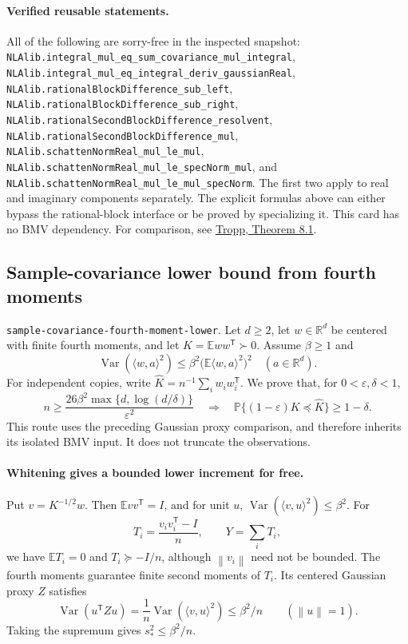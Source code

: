 \documentclass[11pt,a4paper]{article}
\newcommand{\R}{\mathbb R}
\newcommand{\norm}[1]{\left\lVert#1\right\rVert}
\DeclareRobustCommand{\code}[1]{{\footnotesize\urlstyle{tt}\nolinkurl{#1}}}
\begin{document}
\paragraph{Verified reusable statements.}
All of the following are sorry-free in the inspected snapshot:
\code{NLAlib.integral_mul_eq_sum_covariance_mul_integral},
\code{NLAlib.integral_mul_eq_integral_deriv_gaussianReal},
\code{NLAlib.rationalBlockDifference_sub_left},
\code{NLAlib.rationalBlockDifference_sub_right},
\code{NLAlib.rationalSecondBlockDifference_resolvent},
\code{NLAlib.rationalSecondBlockDifference_mul},
\code{NLAlib.schattenNormReal_mul_le_mul},
\code{NLAlib.schattenNormReal_mul_le_specNorm_mul}, and
\code{NLAlib.schattenNormReal_mul_le_mul_specNorm}.
The first two apply to real and imaginary components separately.  The
explicit formulas above can either bypass the rational-block interface
or be proved by specializing it.  This card has no BMV dependency.
For comparison, see
\href{https://arxiv.org/html/2603.05803v2#S8}{Tropp, Theorem 8.1}.

\subsection{Sample-covariance lower bound from fourth moments}
\label{route:sample-covariance-fourth-moment-lower}
\code{sample-covariance-fourth-moment-lower}.
Let $d\ge2$, let $w\in\R^d$ be centered with finite fourth moments,
and let $K=\mathbb Eww^{\mathsf T}\succ0$.  Assume $\beta\ge1$ and
\[
 \operatorname{Var}(\langle w,a\rangle^2)
       \le\beta^2\bigl(\mathbb E\langle w,a\rangle^2\bigr)^2
       \quad(a\in\R^d).
\]
For independent copies, write
$\widehat K=n^{-1}\sum_iw_iw_i^{\mathsf T}$.
We prove that, for $0<\varepsilon,\delta<1$,
\[
 n\ge\frac{26\beta^2\max\{d,\log(d/\delta)\}}{\varepsilon^2}
 \quad\Longrightarrow\quad
 \mathbb P\{(1-\varepsilon)K\preceq\widehat K\}\ge1-\delta.
\]
This route uses the preceding Gaussian proxy comparison, and therefore
inherits its isolated BMV input.  It does not truncate the observations.

\paragraph{Whitening gives a bounded lower increment for free.}
Put $v=K^{-1/2}w$.  Then $\mathbb Evv^{\mathsf T}=I$, and for unit $u$,
$\operatorname{Var}(\langle v,u\rangle^2)\le\beta^2$.
For
\[
 T_i=\frac{v_iv_i^{\mathsf T}-I}{n},\qquad Y=\sum_iT_i,
\]
we have $\mathbb ET_i=0$ and $T_i\succeq-I/n$, although $\norm{v_i}$
need not be bounded.  The fourth moments guarantee finite second moments
of $T_i$.  Its centered Gaussian proxy $Z$ satisfies
\[
 \operatorname{Var}(u^{\mathsf T}Zu)
 =\frac1n\operatorname{Var}(\langle v,u\rangle^2)
 \le\beta^2/n\qquad(\norm{u}=1).
\]
Taking the supremum gives $s_*^2\le\beta^2/n$.
\end{document}
